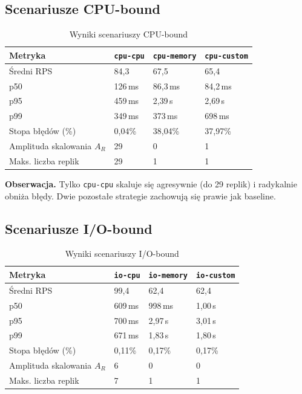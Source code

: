 \subsection{Scenariusze CPU-bound}

\begin{table}[H]
  \centering
  \begin{tabularx}{\textwidth}{|l|X|X|X|}
    \hline
    \textbf{Metryka} & \texttt{cpu-cpu} & \texttt{cpu-memory} & \texttt{cpu-custom} \\
    \hline
    Średni RPS & 84{,}3 & 67{,}5 & 65{,}4 \\
    p50 & 126\,ms & 86{,}3\,ms & 84{,}2\,ms \\
    p95 & 459\,ms & 2{,}39\,s & 2{,}69\,s \\
    p99 & 349\,ms & 373\,ms & 698\,ms \\
    Stopa błędów (\%) & 0{,}04\% & 38{,}04\% & 37{,}97\% \\
    Amplituda skalowania $A_R$ & 29 & 0 & 1 \\
    Maks. liczba replik & 29 & 1 & 1 \\
    \hline
  \end{tabularx}
  \caption{Wyniki scenariuszy CPU-bound}
  \label{tab:cpu-results}
\end{table}

\textbf{Obserwacja.} Tylko \texttt{cpu-cpu} skaluje się agresywnie (do 29 replik) i radykalnie obniża błędy. Dwie pozostałe strategie zachowują się prawie jak baseline.

\subsection{Scenariusze I/O-bound}

\begin{table}[H]
  \centering
  \begin{tabularx}{\textwidth}{|l|X|X|X|}
    \hline
    \textbf{Metryka} & \texttt{io-cpu} & \texttt{io-memory} & \texttt{io-custom} \\
    \hline
    Średni RPS & 99{,}4 & 62{,}4 & 62{,}4 \\
    p50 & 609\,ms & 998\,ms & 1{,}00\,s \\
    p95 & 700\,ms & 2{,}97\,s & 3{,}01\,s \\
    p99 & 671\,ms & 1{,}83\,s & 1{,}80\,s \\
    Stopa błędów (\%) & 0{,}11\% & 0{,}17\% & 0{,}17\% \\
    Amplituda skalowania $A_R$ & 6 & 0 & 0 \\
    Maks. liczba replik & 7 & 1 & 1 \\
    \hline
  \end{tabularx}
  \caption{Wyniki scenariuszy I/O-bound}
  \label{tab:io-results}
\end{table}

